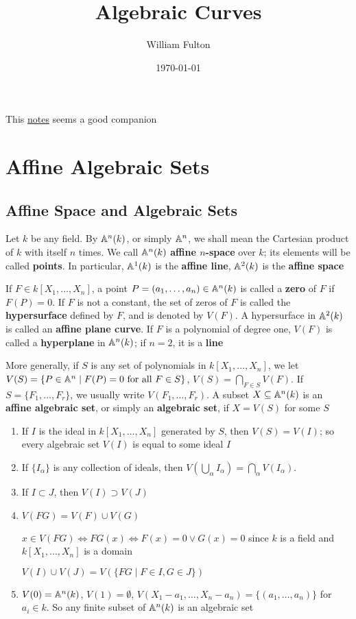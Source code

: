 \documentclass[11pt]{article}
\author{William Fulton}
\date{\today}
\title{Algebraic Curves}
\begin{document}
\maketitle
\tableofcontents

This \href{https://ziyuzhang.github.io/ma40188/Lecture\_Notes\_Long.pdf}{notes} seems a good companion
\section{Affine Algebraic Sets}
\label{sec:orgb8bc7e1}
\subsection{Affine Space and Algebraic Sets}
\label{sec:orgf0c9d7d}
Let \(k\) be any field. By \(\mathbb{A}^n(k)\), or simply \(\mathbb{A}^n\), we shall mean the Cartesian product
of \(k\) with itself \(n\) times. We call \(\mathbb{A}^n(k)\) \textbf{affine \(n\)-space} over \(k\); its elements
will be called \textbf{points}. In particular, \(\mathbb{A}^1(k)\) is the \textbf{affine line}, \(\mathbb{A}^2(k)\) is the \textbf{affine
space}

If \(F\in k[X_1,\dots,X_n]\), a point \(P=(a_1,\dots,a_n)\in\mathbb{A}^n(k)\) is called a \textbf{zero} of \(F\) if \(F(P)=0\).
If \(F\) is not a constant, the set of zeros of \(F\) is called the \textbf{hypersurface} defined
by \(F\), and is denoted by \(V(F)\). A hypersurface in \(\mathbb{A}^2(k)\) is called an \textbf{affine plane
curve}. If \(F\) is a polynomial of degree one, \(V(F)\) is called a \textbf{hyperplane} in \(\mathbb{A}^n(k)\);
if \(n=2\), it is a \textbf{line}

More generally, if \(S\) is any set of polynomials in \(k[X_1,\dots,X_n]\), we
let \(V(S)=\{P\in\mathbb{A}^n\mid F(P)=0\text{ for all }F\in S\}\), \(V(S)=\bigcap_{F\in S}V(F)\). If \(S=\{F_1,\dots,F_r\}\), we
usually write \(V(F_1,\dots,F_r)\). A subset \(X\subseteq\mathbb{A}^n(k)\) is an \textbf{affine algebraic set}, or simply an
\textbf{algebraic set}, if \(X=V(S)\) for some \(S\)

\begin{enumerate}
\item If \(I\) is the ideal in \(k[X_1,\dots,X_n]\) generated by \(S\), then \(V(S)=V(I)\); so every
algebraic set \(V(I)\) is equal to some ideal \(I\)
\item If \(\{I_\alpha\}\) is any collection of ideals, then \(V(\bigcup_\alpha I_\alpha)=\bigcap_\alpha V(I_\alpha)\).
\item If \(I\subset J\), then \(V(I)\supset V(J)\)
\item \(V(FG)=V(F)\cup V(G)\)

\(x\in V(FG)\Leftrightarrow FG(x)\Leftrightarrow F(x)=0\vee G(x)=0\) since \(k\) is a field and \(k[X_1,\dots,X_n]\) is a domain

\(V(I)\cup V(J)=V(\{FG\mid F\in I,G\in J\})\)
\item \(V(0)=\mathbb{A}^n(k)\), \(V(1)=\emptyset\), \(V(X_1-a_1,\dots,X_n-a_n)=\{(a_1,\dots,a_n)\}\) for \(a_i\in k\). So any finite
subset of \(\mathbb{A}^n(k)\) is an algebraic set
\end{enumerate}
\end{document}
